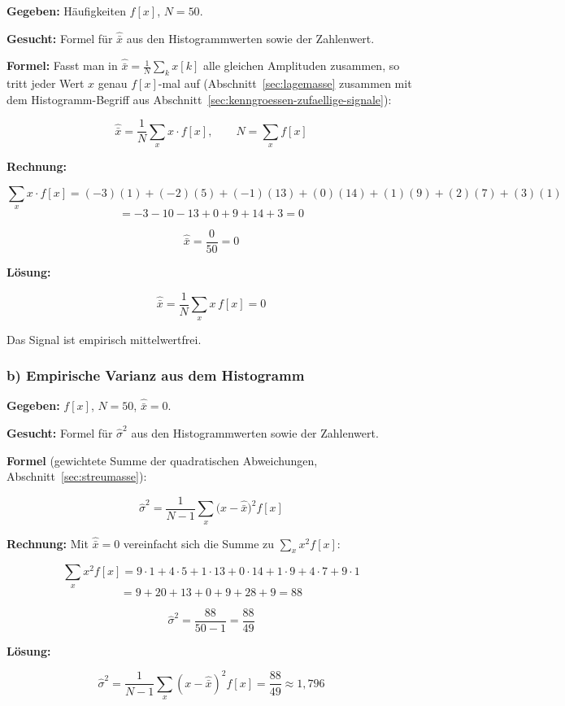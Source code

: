 \begin{beispiel}

\textbf{Gegeben:} Häufigkeiten $f[x]$, $N = 50$.

\textbf{Gesucht:} Formel für $\hat{\bar{x}}$ aus den Histogrammwerten sowie der
Zahlenwert.

\textbf{Formel:} Fasst man in $\hat{\bar{x}} = \tfrac{1}{N}\sum_k x[k]$ alle
gleichen Amplituden zusammen, so tritt jeder Wert $x$ genau $f[x]$-mal auf
(Abschnitt~\ref{sec:lagemasse} zusammen mit dem Histogramm-Begriff aus
Abschnitt~\ref{sec:kenngroessen-zufaellige-signale}):

$$
\hat{\bar{x}} = \frac{1}{N} \sum_{x} x \cdot f[x],
\qquad N = \sum_{x} f[x]
$$

\textbf{Rechnung:}

$$
\sum_{x} x \cdot f[x]
= (-3)(1) + (-2)(5) + (-1)(13) + (0)(14) + (1)(9) + (2)(7) + (3)(1)
$$
$$
= -3 - 10 - 13 + 0 + 9 + 14 + 3 = 0
$$

$$
\hat{\bar{x}} = \frac{0}{50} = 0
$$

\textbf{Lösung:}

$$
\boxed{\;\hat{\bar{x}} = \frac{1}{N}\sum_x x\, f[x] = 0\;}
$$

Das Signal ist empirisch mittelwertfrei.

\end{beispiel}

\subsubsection*{b) Empirische Varianz aus dem Histogramm}

\begin{beispiel}

\textbf{Gegeben:} $f[x]$, $N = 50$, $\hat{\bar{x}} = 0$.

\textbf{Gesucht:} Formel für $\hat{\sigma}^2$ aus den Histogrammwerten sowie der
Zahlenwert.

\textbf{Formel} (gewichtete Summe der quadratischen Abweichungen,
Abschnitt~\ref{sec:streumasse}):

$$
\hat{\sigma}^2 = \frac{1}{N-1} \sum_{x} \bigl(x - \hat{\bar{x}}\bigr)^2 f[x]
$$

\textbf{Rechnung:} Mit $\hat{\bar{x}} = 0$ vereinfacht sich die Summe zu
$\sum_x x^2 f[x]$:

$$
\sum_{x} x^2 f[x]
= 9\cdot 1 + 4\cdot 5 + 1\cdot 13 + 0\cdot 14 + 1\cdot 9 + 4\cdot 7 + 9\cdot 1
$$
$$
= 9 + 20 + 13 + 0 + 9 + 28 + 9 = 88
$$

$$
\hat{\sigma}^2 = \frac{88}{50 - 1} = \frac{88}{49}
$$

\textbf{Lösung:}

$$
\boxed{\;\hat{\sigma}^2 = \frac{1}{N-1}\sum_x (x-\hat{\bar{x}})^2 f[x]
= \frac{88}{49} \approx 1{,}796\;}
$$

\end{beispiel}

